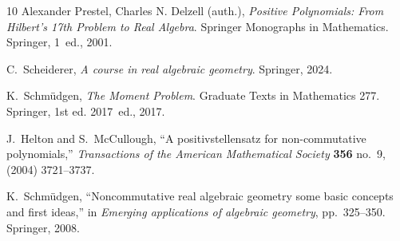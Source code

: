 \documentclass[12pt,a4paper]{article}
\numberwithin{equation}{section}
\theoremstyle{theorem}
\theoremstyle{remark}
\begin{document}
\begin{thebibliography}{10}
{Alexander Prestel, Charles N. Delzell (auth.)}, {\em {Positive Polynomials: From Hilbert’s 17th Problem to Real Algebra}}.
\newblock Springer Monographs in Mathematics. Springer, 1~ed., 2001.

C.~Scheiderer, {\em A course in real algebraic geometry}.
\newblock Springer, 2024.

K.~Schmüdgen, {\em The Moment Problem}.
\newblock Graduate Texts in Mathematics 277. Springer, 1st ed. 2017~ed., 2017.

J.~Helton and S.~McCullough, ``A positivstellensatz for non-commutative polynomials,'' {\em Transactions of the American Mathematical Society} {\bfseries 356} no.~9, (2004) 3721--3737.

K.~Schm{\"u}dgen, ``Noncommutative real algebraic geometry some basic concepts and first ideas,'' in {\em Emerging applications of algebraic geometry}, pp.~325--350.
\newblock Springer, 2008.

\end{thebibliography}
    
 
\end{document}
